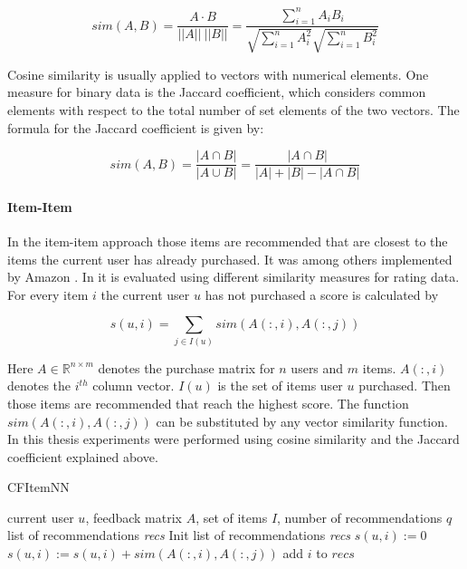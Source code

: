 \documentclass[10pt]{reportMaster}
\begin{document}
\begin{equation}
sim(A, B) =\frac{A \cdot B}{||A||\ ||B||} = \frac{\sum_{i=1}^{n}{A_i B_i}}{\sqrt{\sum_{i=1}^n{A_i^2}}\sqrt{\sum_{i=1}^n{B_i^2}}}
\end{equation}

Cosine similarity is usually applied to vectors with numerical elements.
One measure for binary data is the Jaccard coefficient, which considers common elements with respect to the total number of set elements of the two vectors.
The formula for the Jaccard coefficient is given by:

\begin{equation}
sim(A, B) = \frac{|A \cap B|}{|A \cup B|} = \frac{|A \cap B|}{|A|+|B|-|A \cap B|}
\end{equation}


\paragraph{Item-Item}
In the item-item approach those items are recommended that are closest to the items the current user has already purchased.
It was among others implemented by Amazon \cite{amazonItemItem}.
In \cite{itemItemAlgorithms} it is evaluated using different similarity measures for rating data. %
For every item $i$ the current user $u$ has not purchased a score is calculated by

\begin{equation}
	 s(u,i) = \sum_{j \in I(u)}{sim(A(:,i), A(:,j))}
\end{equation}

Here $A \in \mathds{R}^{n \times m}$ denotes the purchase matrix for $n$ users and $m$ items. $A(:,i)$ denotes the $i^{th}$ column vector. $I(u)$ is the set of items user $u$ purchased.
Then those items are recommended that reach the highest score.
The function $sim(A(:,i), A(:,j))$ can be substituted by any vector similarity function.
In this thesis experiments were performed using cosine similarity and the Jaccard coefficient explained above.

\begin{algorithm}
	\caption{CFItemNN}
	\label{alg:CFItemNN}
	\begin{algorithmic}[1]
		\Require current user $u$, feedback matrix $A$, set of items $I$, number of recommendations $q$
		\Ensure list of recommendations \textit{recs}
		\State Init list of recommendations \textit{recs}
			\State $s(u,i) := 0$
				\State $s(u,i) := s(u,i) + sim(A(:,i), A(:,j))$ 
			\EndFor
				\State add $i$ to $recs$
			\EndIf
		\EndFor
	\end{algorithmic}	
\end{algorithm}
\end{document}
